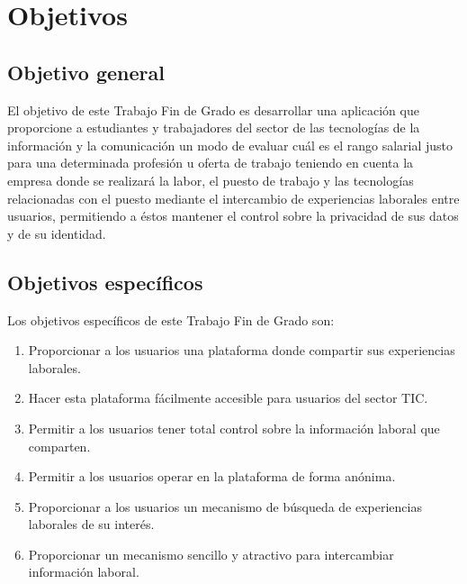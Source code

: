 \documentclass[a4paper, 12pt]{book}
\begin{document}
    \cleardoublepage %


    \chapter{Objetivos} %
    \label{chap:targets} %


    \section{Objetivo general} %
    \label{sec:targets_generaltarget} %

    El objetivo de este Trabajo Fin de Grado es desarrollar una aplicación que proporcione a estudiantes y trabajadores
    del sector de las tecnologías de la información y la comunicación un modo de evaluar cuál es el rango salarial justo
    para una determinada profesión u oferta de trabajo teniendo en cuenta la empresa donde se realizará la labor,
    el puesto de trabajo y las tecnologías relacionadas con el puesto mediante el intercambio de experiencias laborales
    entre usuarios, permitiendo a éstos mantener el control sobre la privacidad de sus datos y de su identidad.


    \section{Objetivos específicos}
    \label{sec:target_specifictargets}

    Los objetivos específicos de este Trabajo Fin de Grado son:

    \begin{enumerate}
        \item Proporcionar a los usuarios una plataforma donde compartir sus experiencias laborales.
        \item Hacer esta plataforma fácilmente accesible para usuarios del sector TIC.
        \item Permitir a los usuarios tener total control sobre la información laboral que comparten.
        \item Permitir a los usuarios operar en la plataforma de forma anónima.
        \item Proporcionar a los usuarios un mecanismo de búsqueda de experiencias laborales de su interés.
        \item Proporcionar un mecanismo sencillo y atractivo para intercambiar información laboral.
    \end{enumerate}
\end{document}
